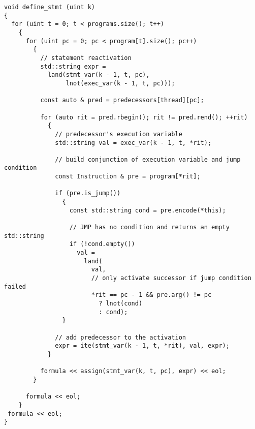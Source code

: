 \begin{lstlisting}[style=c++]
void define_stmt (uint k)
{
  for (uint t = 0; t < programs.size(); t++)
    {
      for (uint pc = 0; pc < program[t].size(); pc++)
        {
          // statement reactivation
          std::string expr =
            land(stmt_var(k - 1, t, pc),
                 lnot(exec_var(k - 1, t, pc)));

          const auto & pred = predecessors[thread][pc];

          for (auto rit = pred.rbegin(); rit != pred.rend(); ++rit)
            {
              // predecessor's execution variable
              std::string val = exec_var(k - 1, t, *rit);

              // build conjunction of execution variable and jump condition
              const Instruction & pre = program[*rit];

              if (pre.is_jump())
                {
                  const std::string cond = pre.encode(*this);

                  // JMP has no condition and returns an empty std::string
                  if (!cond.empty())
                    val =
                      land(
                        val,
                        // only activate successor if jump condition failed
                        *rit == pc - 1 && pre.arg() != pc
                          ? lnot(cond)
                          : cond);
                }

              // add predecessor to the activation
              expr = ite(stmt_var(k - 1, t, *rit), val, expr);
            }

          formula << assign(stmt_var(k, t, pc), expr) << eol;
        }

      formula << eol;
    }
 formula << eol;
}
\end{lstlisting}


